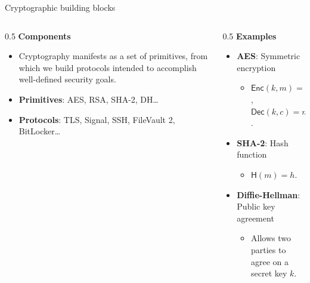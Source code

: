 \documentclass[aspectratio=169, lualatex, handout]{beamer}
\begin{document}
	\begin{frame}{Cryptographic building blocks}
		\begin{columns}[c]
			\begin{column}{0.5\textwidth}
				\textbf{Components}
				\begin{itemize}
					\item Cryptography manifests as a set of primitives, from which we
						build protocols intended to accomplish well-defined security goals.

					\item \textbf{Primitives}: AES, RSA, SHA-2, DH\ldots

					\item \textbf{Protocols}: TLS, Signal, SSH, FileVault 2, BitLocker\ldots
				\end{itemize}
			\end{column}

			\begin{column}{0.5\textwidth}
				\textbf{Examples}
				\begin{itemize}
					\pause

					\item \textbf{AES}: Symmetric encryption
						\begin{itemize}
							\item $\mathsf{Enc}(k, m) = c$, $\mathsf{Dec}(k, c) = m$.
						\end{itemize}
						\pause

					\item \textbf{SHA-2}: Hash function
						\begin{itemize}
							\item $\mathsf{H}(m) = h$.
						\end{itemize}
						\pause

					\item \textbf{Diffie-Hellman}: Public key agreement
						\begin{itemize}
							\item Allows two parties to agree on a secret key $k$.
						\end{itemize}
				\end{itemize}
			\end{column}
		\end{columns}
	\end{frame}
\end{document}
